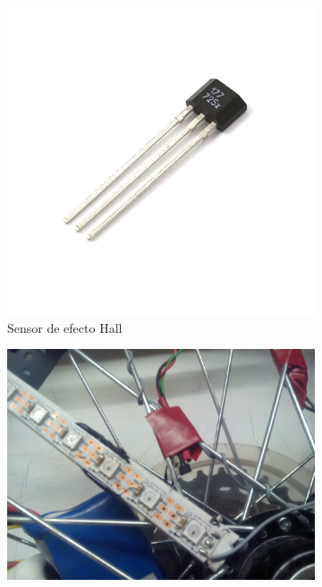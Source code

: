 \begin{figure}[!ht]
	\centering

	\begin{subfigure}[t]{0.4\textwidth}
		\centering
		\includegraphics[width=\textwidth]{images/pasoVuelta-hall}
		\caption{Sensor de efecto Hall}
		\label{fig:pasoVuelta-hall}
	\end{subfigure}
	\hspace{0.5cm}
	\begin{subfigure}[t]{0.4\textwidth}
		\centering
		\includegraphics[width=\textwidth]{images/pasoVuelta-montaje}

\end{subfigure}
\end{figure}
